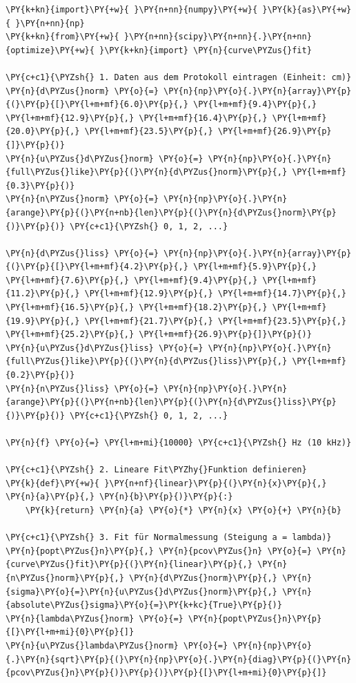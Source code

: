     \begin{tcolorbox}[breakable, size=fbox, boxrule=1pt, pad at break*=1mm,colback=cellbackground, colframe=cellborder]
\begin{Verbatim}[commandchars=\\\{\}]
\PY{k+kn}{import}\PY{+w}{ }\PY{n+nn}{numpy}\PY{+w}{ }\PY{k}{as}\PY{+w}{ }\PY{n+nn}{np}
\PY{k+kn}{from}\PY{+w}{ }\PY{n+nn}{scipy}\PY{n+nn}{.}\PY{n+nn}{optimize}\PY{+w}{ }\PY{k+kn}{import} \PY{n}{curve\PYZus{}fit}

\PY{c+c1}{\PYZsh{} 1. Daten aus dem Protokoll eintragen (Einheit: cm)}
\PY{n}{d\PYZus{}norm} \PY{o}{=} \PY{n}{np}\PY{o}{.}\PY{n}{array}\PY{p}{(}\PY{p}{[}\PY{l+m+mf}{6.0}\PY{p}{,} \PY{l+m+mf}{9.4}\PY{p}{,} \PY{l+m+mf}{12.9}\PY{p}{,} \PY{l+m+mf}{16.4}\PY{p}{,} \PY{l+m+mf}{20.0}\PY{p}{,} \PY{l+m+mf}{23.5}\PY{p}{,} \PY{l+m+mf}{26.9}\PY{p}{]}\PY{p}{)}
\PY{n}{u\PYZus{}d\PYZus{}norm} \PY{o}{=} \PY{n}{np}\PY{o}{.}\PY{n}{full\PYZus{}like}\PY{p}{(}\PY{n}{d\PYZus{}norm}\PY{p}{,} \PY{l+m+mf}{0.3}\PY{p}{)}
\PY{n}{n\PYZus{}norm} \PY{o}{=} \PY{n}{np}\PY{o}{.}\PY{n}{arange}\PY{p}{(}\PY{n+nb}{len}\PY{p}{(}\PY{n}{d\PYZus{}norm}\PY{p}{)}\PY{p}{)} \PY{c+c1}{\PYZsh{} 0, 1, 2, ...}

\PY{n}{d\PYZus{}liss} \PY{o}{=} \PY{n}{np}\PY{o}{.}\PY{n}{array}\PY{p}{(}\PY{p}{[}\PY{l+m+mf}{4.2}\PY{p}{,} \PY{l+m+mf}{5.9}\PY{p}{,} \PY{l+m+mf}{7.6}\PY{p}{,} \PY{l+m+mf}{9.4}\PY{p}{,} \PY{l+m+mf}{11.2}\PY{p}{,} \PY{l+m+mf}{12.9}\PY{p}{,} \PY{l+m+mf}{14.7}\PY{p}{,} \PY{l+m+mf}{16.5}\PY{p}{,} \PY{l+m+mf}{18.2}\PY{p}{,} \PY{l+m+mf}{19.9}\PY{p}{,} \PY{l+m+mf}{21.7}\PY{p}{,} \PY{l+m+mf}{23.5}\PY{p}{,} \PY{l+m+mf}{25.2}\PY{p}{,} \PY{l+m+mf}{26.9}\PY{p}{]}\PY{p}{)}
\PY{n}{u\PYZus{}d\PYZus{}liss} \PY{o}{=} \PY{n}{np}\PY{o}{.}\PY{n}{full\PYZus{}like}\PY{p}{(}\PY{n}{d\PYZus{}liss}\PY{p}{,} \PY{l+m+mf}{0.2}\PY{p}{)}
\PY{n}{n\PYZus{}liss} \PY{o}{=} \PY{n}{np}\PY{o}{.}\PY{n}{arange}\PY{p}{(}\PY{n+nb}{len}\PY{p}{(}\PY{n}{d\PYZus{}liss}\PY{p}{)}\PY{p}{)} \PY{c+c1}{\PYZsh{} 0, 1, 2, ...}

\PY{n}{f} \PY{o}{=} \PY{l+m+mi}{10000} \PY{c+c1}{\PYZsh{} Hz (10 kHz)}

\PY{c+c1}{\PYZsh{} 2. Lineare Fit\PYZhy{}Funktion definieren}
\PY{k}{def}\PY{+w}{ }\PY{n+nf}{linear}\PY{p}{(}\PY{n}{x}\PY{p}{,} \PY{n}{a}\PY{p}{,} \PY{n}{b}\PY{p}{)}\PY{p}{:}
    \PY{k}{return} \PY{n}{a} \PY{o}{*} \PY{n}{x} \PY{o}{+} \PY{n}{b}

\PY{c+c1}{\PYZsh{} 3. Fit für Normalmessung (Steigung a = lambda)}
\PY{n}{popt\PYZus{}n}\PY{p}{,} \PY{n}{pcov\PYZus{}n} \PY{o}{=} \PY{n}{curve\PYZus{}fit}\PY{p}{(}\PY{n}{linear}\PY{p}{,} \PY{n}{n\PYZus{}norm}\PY{p}{,} \PY{n}{d\PYZus{}norm}\PY{p}{,} \PY{n}{sigma}\PY{o}{=}\PY{n}{u\PYZus{}d\PYZus{}norm}\PY{p}{,} \PY{n}{absolute\PYZus{}sigma}\PY{o}{=}\PY{k+kc}{True}\PY{p}{)}
\PY{n}{lambda\PYZus{}norm} \PY{o}{=} \PY{n}{popt\PYZus{}n}\PY{p}{[}\PY{l+m+mi}{0}\PY{p}{]}
\PY{n}{u\PYZus{}lambda\PYZus{}norm} \PY{o}{=} \PY{n}{np}\PY{o}{.}\PY{n}{sqrt}\PY{p}{(}\PY{n}{np}\PY{o}{.}\PY{n}{diag}\PY{p}{(}\PY{n}{pcov\PYZus{}n}\PY{p}{)}\PY{p}{)}\PY{p}{[}\PY{l+m+mi}{0}\PY{p}{]}


\end{Verbatim}
\end{tcolorbox}
